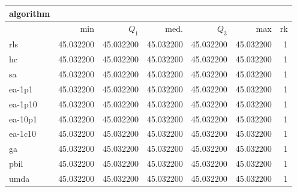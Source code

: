 \begin{tabular}{@{}l*{5}{>{{}}N{2}{2}}>{{}}N{2}{0}@{}}
\toprule
{algorithm} &  \\
\midrule
& {min} & {$Q_1$} & {med.} & {$Q_3$} & {max} & {rk}\\
\midrule
rls & {\color{blue}} 45.032200 & {\color{blue}} 45.032200 & {\color{blue}} 45.032200 & {\color{blue}} 45.032200 & {\color{blue}} 45.032200 & 1\\
hc & {\color{blue}} 45.032200 & {\color{blue}} 45.032200 & {\color{blue}} 45.032200 & {\color{blue}} 45.032200 & {\color{blue}} 45.032200 & 1\\
sa & {\color{blue}} 45.032200 & {\color{blue}} 45.032200 & {\color{blue}} 45.032200 & {\color{blue}} 45.032200 & {\color{blue}} 45.032200 & 1\\
ea-1p1 & {\color{blue}} 45.032200 & {\color{blue}} 45.032200 & {\color{blue}} 45.032200 & {\color{blue}} 45.032200 & {\color{blue}} 45.032200 & 1\\
ea-1p10 & {\color{blue}} 45.032200 & {\color{blue}} 45.032200 & {\color{blue}} 45.032200 & {\color{blue}} 45.032200 & {\color{blue}} 45.032200 & 1\\
ea-10p1 & {\color{blue}} 45.032200 & {\color{blue}} 45.032200 & {\color{blue}} 45.032200 & {\color{blue}} 45.032200 & {\color{blue}} 45.032200 & 1\\
ea-1c10 & {\color{blue}} 45.032200 & {\color{blue}} 45.032200 & {\color{blue}} 45.032200 & {\color{blue}} 45.032200 & {\color{blue}} 45.032200 & 1\\
ga & {\color{blue}} 45.032200 & {\color{blue}} 45.032200 & {\color{blue}} 45.032200 & {\color{blue}} 45.032200 & {\color{blue}} 45.032200 & 1\\
pbil & {\color{blue}} 45.032200 & {\color{blue}} 45.032200 & {\color{blue}} 45.032200 & {\color{blue}} 45.032200 & {\color{blue}} 45.032200 & 1\\
umda & {\color{blue}} 45.032200 & {\color{blue}} 45.032200 & {\color{blue}} 45.032200 & {\color{blue}} 45.032200 & {\color{blue}} 45.032200 & 1\\
\bottomrule
\end{tabular}
